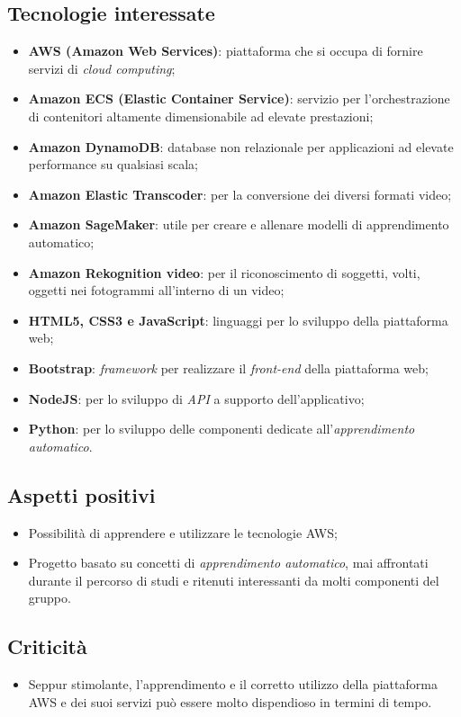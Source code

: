 \subsection{Tecnologie interessate}
\begin{itemize}
	\item \textbf{AWS (Amazon Web Services)}: piattaforma che si occupa di fornire servizi di \textit{cloud computing\glos};
	\item \textbf{Amazon ECS (Elastic Container Service)}: servizio per l'orchestrazione di contenitori altamente dimensionabile ad elevate	prestazioni;
	\item \textbf{Amazon DynamoDB}:  database non relazionale per applicazioni ad elevate performance su qualsiasi scala;
	\item \textbf{Amazon Elastic Transcoder}: per la conversione dei diversi formati video;
	\item \textbf{Amazon SageMaker}: utile per creare e allenare modelli di apprendimento automatico\glos;
	\item \textbf{Amazon Rekognition video}: per il riconoscimento di soggetti, volti, oggetti nei fotogrammi all'interno di un video;
	\item \textbf{HTML5, CSS3 e JavaScript}: linguaggi per lo sviluppo della piattaforma web;
	\item \textbf{Bootstrap}: \textit{framework\glo} per realizzare il \textit{front-end\glo} della piattaforma web;
	\item \textbf{NodeJS}: per lo sviluppo di \textit{API\glo} a supporto dell'applicativo;
	\item \textbf{Python}: per lo sviluppo delle componenti dedicate all'\textit{apprendimento automatico\glos}.
\end{itemize}

\subsection{Aspetti positivi}
\begin{itemize}
	\item Possibilità di apprendere e utilizzare le tecnologie AWS;
	\item Progetto basato su concetti di \textit{apprendimento automatico\glos}, mai affrontati durante il percorso di studi e ritenuti interessanti da molti componenti del gruppo.
\end{itemize}

\subsection{Criticità}
\begin{itemize}
	\item Seppur stimolante, l'apprendimento e il corretto utilizzo della piattaforma AWS e dei suoi servizi può essere molto dispendioso in termini di tempo.
	
\end{itemize}

